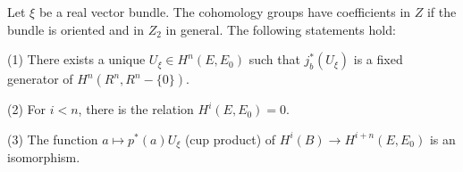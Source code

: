 Let $\xi$ be a real vector bundle. The cohomology groups have coefficients in $Z$ if the bundle is oriented and in $Z_2$ in general. The following statements hold:

(1) There exists a unique $U_\xi \in H^n(E, E_0)$ such that $j_b^*(U_\xi)$ is a fixed generator of $H^n(R^n, R^n - \{0\})$.

(2) For $i < n$, there is the relation $H^i(E, E_0) = 0$.

(3) The function $a \mapsto p^*(a)U_\xi$ (cup product) of $H^i(B) \rightarrow H^{i+n}(E, E_0)$ is an isomorphism.
